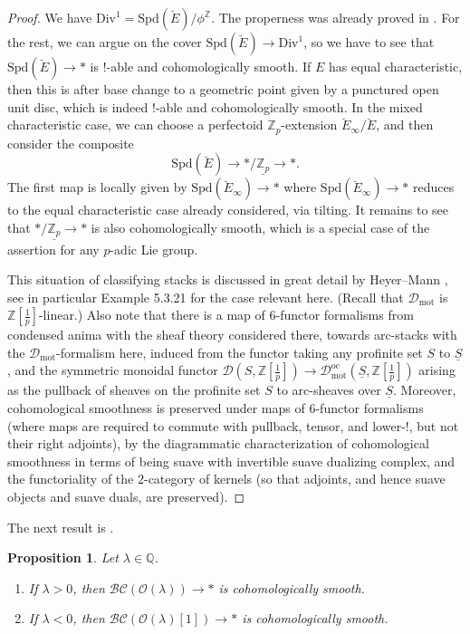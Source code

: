 \documentclass[11pt]{amsart}
\numberwithin{equation}{section}
\numberwithin{theorem}{section}
\newtheorem{proposition}[theorem]{Proposition}
\theoremstyle{definition}
\newcommand{\BC}{\mathcal{BC}}
\newcommand{\Div}{\mathrm{Div}}
\newcommand{\Spd}{\mathrm{Spd}}
\begin{document}
\begin{proof} We have $\Div^1=\Spd(\breve{E})/\phi^{\mathbb{Z}}$. The properness was already proved in \cite{FarguesScholze}. For the rest, we can argue on the cover $\Spd(\breve{E})\to \Div^1$, so we have to see that $\Spd(\breve{E})\to \ast$ is $!$-able and cohomologically smooth. If $E$ has equal characteristic, then this is after base change to a geometric point given by a punctured open unit disc, which is indeed $!$-able and cohomologically smooth. In the mixed characteristic case, we can choose a perfectoid $\mathbb Z_p$-extension $\breve{E}_\infty/\breve{E}$, and then consider the composite
\[
\Spd(\breve{E})\to \ast/\underline{\mathbb Z_p}\to \ast.
\]
The first map is locally given by $\Spd(\breve{E}_\infty)\to \ast$ where $\Spd(\breve{E}_\infty)\to \ast$ reduces to the equal characteristic case already considered, via tilting. It remains to see that $\ast/\underline{\mathbb Z_p}\to \ast$ is also cohomologically smooth, which is a special case of the assertion for any $p$-adic Lie group.

This situation of classifying stacks is discussed in great detail by Heyer--Mann \cite[Section 5]{HeyerMann}, see in particular Example 5.3.21 for the case relevant here. (Recall that $\mathcal D_{\mathrm{mot}}$ is $\mathbb Z[\tfrac 1p]$-linear.) Also note that there is a map of $6$-functor formalisms from condensed anima with the sheaf theory considered there, towards arc-stacks with the $\mathcal D_{\mathrm{mot}}$-formalism here, induced from the functor taking any profinite set $S$ to $\underline{S}$, and the symmetric monoidal functor $\mathcal D(S,\mathbb Z[\tfrac 1p])\to \mathcal D_{\mathrm{mot}}^{\mathrm{oc}}(\underline{S},\mathbb Z[\tfrac 1p])$ arising as the pullback of sheaves on the profinite set $S$ to arc-sheaves over $\underline{S}$. Moreover, cohomological smoothness is preserved under maps of $6$-functor formalisms (where maps are required to commute with pullback, tensor, and lower-$!$, but not their right adjoints), by the diagrammatic characterization \cite[Definition 4.5.1]{HeyerMann} of cohomological smoothness in terms of being suave with invertible suave dualizing complex, and the functoriality \cite[Proposition 4.2.1]{HeyerMann} of the $2$-category of kernels (so that adjoints, and hence suave objects and suave duals, are preserved).
\end{proof}

The next result is \cite[Proposition II.2.5]{FarguesScholze}.

\begin{proposition}\label{prop:BCsmooth} Let $\lambda\in \mathbb Q$.
\begin{enumerate}
\item[{\rm (i)}] If $\lambda>0$, then $\BC(\mathcal O(\lambda))\to \ast$ is cohomologically smooth.
\item[{\rm (ii)}] If $\lambda<0$, then $\BC(\mathcal O(\lambda)[1])\to \ast$ is cohomologically smooth.
\end{enumerate}
\end{proposition}
\end{document}
